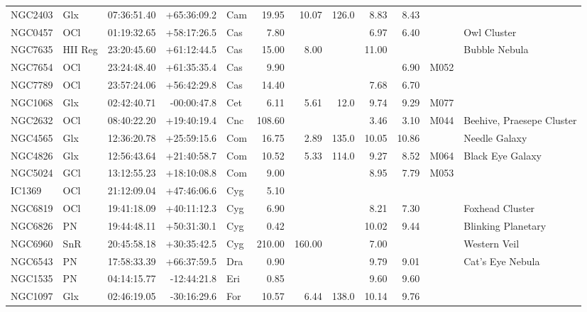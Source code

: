 \documentclass[11pt]{article}
\begin{document}
\begin{longtable}{llrrlrrrrrrl}
  NGC2403 & Glx     & 07:36:51.40 & +65:36:09.2 & Cam & 19.95  & 10.07  & 126.0 & 8.83  & 8.43   &      & \\
  NGC0457 & OCl     & 01:19:32.65 & +58:17:26.5 & Cas & 7.80   &        &       & 6.97  & 6.40   &      & Owl Cluster \\
  NGC7635 & HII Reg & 23:20:45.60 & +61:12:44.5 & Cas & 15.00  & 8.00   &       & 11.00 &        &      & Bubble Nebula \\
  NGC7654 & OCl     & 23:24:48.40 & +61:35:35.4 & Cas & 9.90   &        &       &       & 6.90   & M052 & \\
  NGC7789 & OCl     & 23:57:24.06 & +56:42:29.8 & Cas & 14.40  &        &       & 7.68  & 6.70   &      & \\
  NGC1068 & Glx     & 02:42:40.71 & -00:00:47.8 & Cet & 6.11   & 5.61   & 12.0  & 9.74  & 9.29   & M077 & \\
  NGC2632 & OCl     & 08:40:22.20 & +19:40:19.4 & Cnc & 108.60 &        &       & 3.46  & 3.10   & M044 & Beehive, Praesepe Cluster \\
  NGC4565 & Glx     & 12:36:20.78 & +25:59:15.6 & Com & 16.75  & 2.89   & 135.0 & 10.05 & 10.86  &      & Needle Galaxy \\
  NGC4826 & Glx     & 12:56:43.64 & +21:40:58.7 & Com & 10.52  & 5.33   & 114.0 & 9.27  & 8.52   & M064 & Black Eye Galaxy\\
  NGC5024 & GCl     & 13:12:55.23 & +18:10:08.8 & Com & 9.00   &        &       & 8.95  & 7.79   & M053 & \\
  IC1369  & OCl     & 21:12:09.04 & +47:46:06.6 & Cyg & 5.10   &        &       &       &        &      & \\
  NGC6819 & OCl     & 19:41:18.09 & +40:11:12.3 & Cyg & 6.90   &        &       & 8.21  & 7.30   &      & Foxhead Cluster \\
  NGC6826 & PN      & 19:44:48.11 & +50:31:30.1 & Cyg & 0.42   &        &       & 10.02 & 9.44   &      & Blinking Planetary \\
  NGC6960 & SnR     & 20:45:58.18 & +30:35:42.5 & Cyg & 210.00 & 160.00 &       & 7.00  &        &      & Western Veil \\
  NGC6543 & PN      & 17:58:33.39 & +66:37:59.5 & Dra & 0.90   &        &       & 9.79  & 9.01   &      & Cat's Eye Nebula \\
  NGC1535 & PN      & 04:14:15.77 & -12:44:21.8 & Eri & 0.85   &        &       & 9.60  & 9.60   &      & \\
  NGC1097 & Glx     & 02:46:19.05 & -30:16:29.6 & For & 10.57  & 6.44   & 138.0 & 10.14 & 9.76   &      & \\

\end{longtable}
\end{document}

